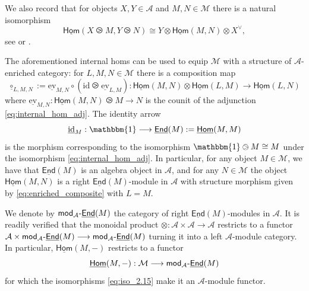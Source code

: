 \documentclass[11pt]{article}
\theoremstyle{definition}
\begin{document}
We also record that for objects $X,Y \in \mathcal{A}$ and $M,N \in \mathcal{M}$ there is a natural isomorphism
\begin{equation}\label{eq:iso_2.15}
\underline{\mathsf{Hom}}(X \ogreaterthan M, Y \ogreaterthan N) \cong Y \otimes \underline{\mathsf{Hom}}(M,N) \otimes X^\vee,
\end{equation}
see \cite[Lemma 7.9.4]{egno} or \cite[(2.15)]{shimizuunimodular}.

The aforementioned internal homs can be used to equip $\mathcal{M}$ with a structure of $\mathcal{A}$-enriched category: for $L,M,N \in \mathcal{M}$ there is a composition map
\begin{equation}\label{eq:enriched_composite}
\underline{\circ}_{L,M,N} := \underline{\mathrm{ev}}_{M,N} \circ (\mathrm{id} \ogreaterthan \underline{\mathrm{ev}}_{L,M}) : \underline{\mathsf{Hom}}(M,N)\otimes \underline{\mathsf{Hom}}(L,M)\longrightarrow \underline{\mathsf{Hom}}(L,N)
\end{equation}
where $\underline{\mathrm{ev}}_{M,N} : \underline{\mathsf{Hom}}(M,N) \ogreaterthan M \longrightarrow N$ is the counit of the adjunction  \eqref{eq:internal_hom_adj}. The identity arrow $$ \underline{\mathrm{id}}_M:  \mathbbm{1} \longrightarrow \underline{\mathsf{End}}(M):= \underline{\mathsf{Hom}}(M,M) $$  is the morphism corresponding to the isomorphism $\mathbbm{1} \ogreaterthan M \cong M$ under the isomorphism \eqref{eq:internal_hom_adj}. In particular, for any object $M \in \mathcal{M}$, we have that $\underline{\mathsf{End}}(M)$ is an algebra object in $\mathcal{A}$, and for any  $N \in \mathcal{M}$ the object $\underline{\mathsf{Hom}}(M,N)$ is a right $\underline{\mathsf{End}}(M)$-module in $\mathcal{A}$ with structure morphism given by \eqref{eq:enriched_composite} with $L=M$.

We denote by $\mathsf{mod}_\mathcal{A}{\text -}\underline{\mathsf{End}}(M)$ the category of right $\underline{\mathsf{End}}(M)$-modules in $\mathcal{A}$. It is readily verified that the monoidal product $\otimes : \mathcal{A} \times \mathcal{A} \longrightarrow \mathcal{A}$ restricts to a functor  $\mathcal{A} \times \mathsf{mod}_\mathcal{A}{\text -}\underline{\mathsf{End}}(M)\longrightarrow \mathsf{mod}_\mathcal{A}{\text -}\underline{\mathsf{End}}(M)$ turning it into  a left $\mathcal{A}$-module category. In particular, $\underline{\mathsf{Hom}}(M,-)$ restricts to a functor
$$\underline{\mathsf{Hom}}(M,-): \mathcal{M} \longrightarrow  \mathsf{mod}_\mathcal{A}{\text -}\underline{\mathsf{End}}(M)  $$ for which the isomorphisms \eqref{eq:iso_2.15} make it an $\mathcal{A}$-module functor.
\end{document}
